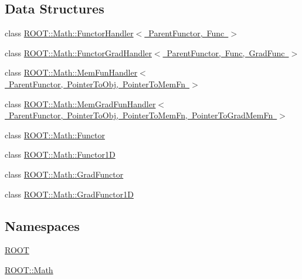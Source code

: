 \subsection*{Data Structures}
\begin{DoxyCompactItemize}
\item 
class \mbox{\hyperlink{classROOT_1_1Math_1_1FunctorHandler}{R\+O\+O\+T\+::\+Math\+::\+Functor\+Handler$<$ Parent\+Functor, Func $>$}}
\item 
class \mbox{\hyperlink{classROOT_1_1Math_1_1FunctorGradHandler}{R\+O\+O\+T\+::\+Math\+::\+Functor\+Grad\+Handler$<$ Parent\+Functor, Func, Grad\+Func $>$}}
\item 
class \mbox{\hyperlink{classROOT_1_1Math_1_1MemFunHandler}{R\+O\+O\+T\+::\+Math\+::\+Mem\+Fun\+Handler$<$ Parent\+Functor, Pointer\+To\+Obj, Pointer\+To\+Mem\+Fn $>$}}
\item 
class \mbox{\hyperlink{classROOT_1_1Math_1_1MemGradFunHandler}{R\+O\+O\+T\+::\+Math\+::\+Mem\+Grad\+Fun\+Handler$<$ Parent\+Functor, Pointer\+To\+Obj, Pointer\+To\+Mem\+Fn, Pointer\+To\+Grad\+Mem\+Fn $>$}}
\item 
class \mbox{\hyperlink{classROOT_1_1Math_1_1Functor}{R\+O\+O\+T\+::\+Math\+::\+Functor}}
\item 
class \mbox{\hyperlink{classROOT_1_1Math_1_1Functor1D}{R\+O\+O\+T\+::\+Math\+::\+Functor1D}}
\item 
class \mbox{\hyperlink{classROOT_1_1Math_1_1GradFunctor}{R\+O\+O\+T\+::\+Math\+::\+Grad\+Functor}}
\item 
class \mbox{\hyperlink{classROOT_1_1Math_1_1GradFunctor1D}{R\+O\+O\+T\+::\+Math\+::\+Grad\+Functor1D}}
\end{DoxyCompactItemize}
\subsection*{Namespaces}
\begin{DoxyCompactItemize}
\item 
 \mbox{\hyperlink{namespaceROOT}{R\+O\+OT}}
\item 
 \mbox{\hyperlink{namespaceROOT_1_1Math}{R\+O\+O\+T\+::\+Math}}
\end{DoxyCompactItemize}
